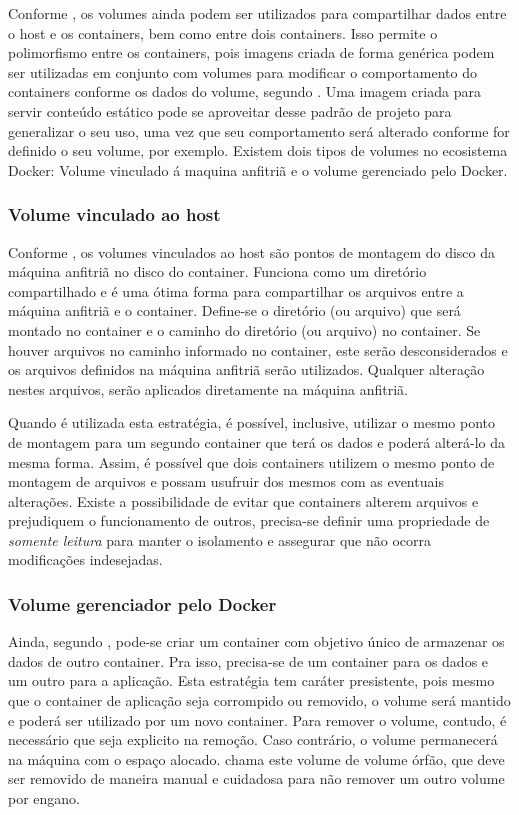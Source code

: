\documentclass[
	12pt,				%
	openright,			%
	oneside,			%
	a4paper,			%
	chapter=TITLE,		%
	section=TITLE,		%
	english,			%
	french,				%
	spanish,			%
	brazil				%
	]{abntex2}
\begin{document}
Conforme , os volumes ainda podem ser utilizados para compartilhar dados entre o host e os containers, bem como entre dois containers. Isso permite o polimorfismo entre os containers, pois imagens criada de forma genérica podem ser utilizadas em conjunto com volumes para modificar o comportamento do containers conforme os dados do volume, segundo . Uma imagem criada para servir conteúdo estático pode se aproveitar desse padrão de projeto para generalizar o seu uso, uma vez que seu comportamento será alterado conforme for definido o seu volume, por exemplo. Existem dois tipos de volumes no ecosistema Docker: Volume vinculado á maquina anfitriã e o volume gerenciado pelo Docker.

\subsubsection{Volume vinculado ao host}

Conforme , os volumes vinculados ao host são pontos de montagem do disco da máquina anfitriã no disco do container. Funciona como um diretório compartilhado e é uma ótima forma para compartilhar os arquivos entre a máquina anfitriã e o container. Define-se o diretório (ou arquivo) que será montado no container e o caminho do diretório (ou arquivo) no container. Se houver arquivos no caminho informado no container, este serão desconsiderados e os arquivos definidos na máquina anfitriã serão utilizados. Qualquer alteração nestes arquivos, serão aplicados diretamente na máquina anfitriã.

Quando é utilizada esta estratégia, é possível, inclusive, utilizar o mesmo ponto de montagem para um segundo container que terá os dados e poderá alterá-lo da mesma forma. Assim, é possível que dois containers utilizem o mesmo ponto de montagem de arquivos e possam usufruir dos mesmos com as eventuais alterações. Existe a possibilidade de evitar que containers alterem arquivos e prejudiquem o funcionamento de outros, precisa-se definir uma propriedade de \textit{somente leitura} para manter o isolamento e assegurar que não ocorra modificações indesejadas.

\subsubsection{Volume gerenciador pelo Docker}

Ainda, segundo , pode-se criar um container com objetivo único de armazenar os dados de outro container. Pra isso, precisa-se de um container para os dados e um outro para a aplicação. Esta estratégia tem caráter presistente, pois mesmo que o container de aplicação seja corrompido ou removido, o volume será mantido e poderá ser utilizado por um novo container. Para remover o volume, contudo, é necessário que seja explicito na remoção. Caso contrário, o volume permanecerá na máquina com o espaço alocado.  chama este volume de volume órfão, que deve ser removido de maneira manual e cuidadosa para não remover um outro volume por engano.
\end{document}
